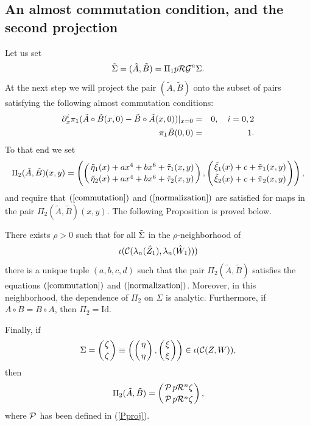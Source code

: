 \subsection{An almost commutation condition, and the second projection}
Let us set 
$$\tilde\Sigma=(\tilde A,\tilde B)=\Pi_1 p \mathcal{RG}^n\Sigma.$$
At the next step we will project the pair $(\tilde A, \tilde B)$ onto the subset of pairs satisfying the following almost commutation conditions:
\begin{eqnarray} \label{commutation}
\partial_x^i \pi_1(\tilde A \circ \tilde B(x,0) - \tilde B \circ \tilde A(x,0))\arrowvert_{x=0}&=&0, \quad i=0,2 \\
\label{normalization} \pi_1 \tilde B(0,0)&=&1.
\end{eqnarray}
To that end we set 
$$\Pi_2 (\tilde A,\tilde B)(x,y)=\left( \left( \tilde \eta_1(x) +a x^4+b x^6 + \tilde \tau_1(x,y) \atop   \tilde \eta_2(x) +a x^4+b x^6+ \tilde \tau_2(x,y)  \right), \left( \tilde \xi_1(x)+c  + \tilde \pi_1(x,y) \atop   \tilde \xi_2(x) +c +\tilde \pi_2(x,y)  \right)   \right),$$
and require that $(\ref{commutation})$ and $(\ref{normalization})$ are satisfied for maps in the pair $\Pi_2 (\tilde A,\tilde B)(x,y)$. The following Proposition is proved below.
\begin{prop}\label{prop:2Dprojection}
There exists $\rho>0$ such that for all $\tilde\Sigma$ in the $\rho$-neighborhood of $$\iota(\mathcal{C}(\lambda_n(\hat Z_1),\lambda_n(\hat W_1)))$$
there is a unique tuple $(a,b,c,d)$ such that the pair $ \Pi_2 (\tilde A,\tilde B)$ satisfies the equations $(\ref{commutation})$ and $(\ref{normalization})$. Moreover, in this neighborhood, the dependence of $\Pi_2$ on $\Sigma$ is analytic.  
Furthermore, if $A\circ B=B\circ A$, then 
$\Pi_2=\text{Id}.$

Finally, if $$\Sigma=\left( \zeta \atop \zeta \right) \equiv \left(\left(\eta \atop \eta  \right), \left(\xi \atop \xi  \right)  \right) \in \iota(\mathcal{C}(Z,W)), $$ then 
$$\Pi_2 (\tilde A,\tilde B)=\left(\mathcal{P} \hspace{0.5mm} p \mathcal{R}^n\zeta \atop \mathcal{P} \hspace{0.5mm} p \mathcal{R}^n \zeta  \right),$$
where $\mathcal{P}$ has been defined in (\ref{Pproj}). 
\end{prop}

